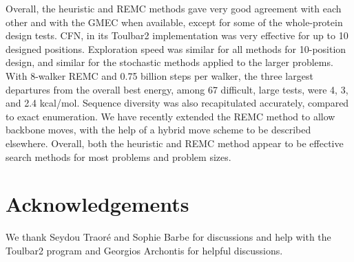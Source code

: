 \documentclass[a4paper,12pt]{article}
\begin{document}
Overall, the heuristic and REMC methods gave very good agreement with each other and with the GMEC when available,
except for some of the whole-protein design tests. CFN, in its Toulbar2 implementation was very effective for up to
10 designed positions. Exploration speed was similar for all methods for 10-position design, and similar for the
stochastic methods applied to the larger problems. With 8-walker REMC and 0.75 billion steps per walker, the three
largest departures from the overall best energy, among 67 difficult, large tests, were 4, 3, and 2.4 kcal/mol.
Sequence diversity was also recapitulated accurately, compared to exact enumeration. We have recently extended the
REMC method to allow backbone moves, with the help of a hybrid move scheme to be described elsewhere. Overall, both
the heuristic and REMC method appear to be effective search methods for most problems and problem sizes.

\section*{Acknowledgements}
We thank Seydou Traor\'e and Sophie Barbe for discussions and help with the Toulbar2 program and Georgios Archontis
for helpful discussions.

\small 

\end{document}
